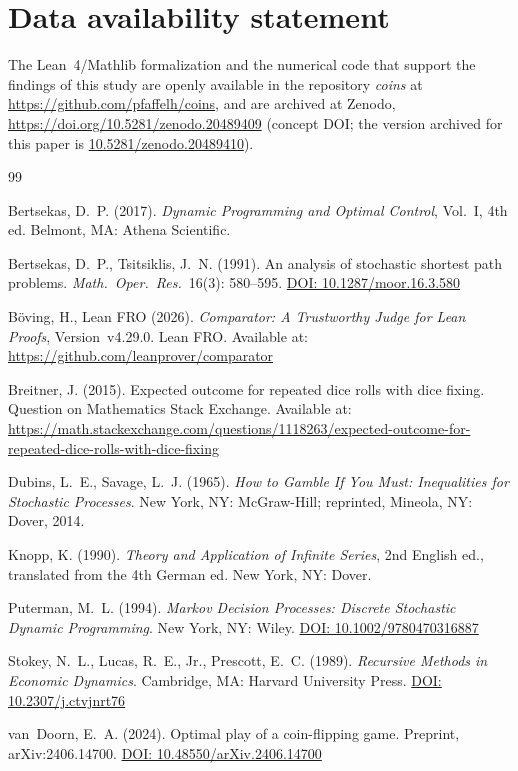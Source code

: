 \documentclass[12pt]{article}
\theoremstyle{definition}
\theoremstyle{remark}
\begin{document}
\section*{Data availability statement}

The Lean~4/Mathlib formalization and the numerical code that support
the findings of this study are openly available in the repository
\emph{coins} at \url{https://github.com/pfaffelh/coins}, and are
archived at Zenodo,
\url{https://doi.org/10.5281/zenodo.20489409} (concept DOI; the
version archived for this paper is
\href{https://doi.org/10.5281/zenodo.20489410}{10.5281/zenodo.20489410}).


\begin{thebibliography}{99}

  Bertsekas, D.~P. (2017).
  \emph{Dynamic Programming and Optimal Control},
  Vol.~I, 4th ed.
  Belmont, MA: Athena Scientific.

  Bertsekas, D.~P., Tsitsiklis, J.~N. (1991).
  An analysis of stochastic shortest path problems.
  \emph{Math.\ Oper.\ Res.}\ 16(3): 580--595.
  \href{https://doi.org/10.1287/moor.16.3.580}{DOI: 10.1287/moor.16.3.580}

  B\"oving, H., Lean FRO (2026).
  \emph{Comparator: A Trustworthy Judge for Lean Proofs},
  Version~v4.29.0. Lean FRO.
  Available at: \url{https://github.com/leanprover/comparator}

  Breitner, J. (2015).
  Expected outcome for repeated dice rolls with dice fixing.
  Question on Mathematics Stack Exchange.
  Available at:
  \url{https://math.stackexchange.com/questions/1118263/expected-outcome-for-repeated-dice-rolls-with-dice-fixing}

  Dubins, L.~E., Savage, L.~J. (1965).
  \emph{How to Gamble If You Must: Inequalities for Stochastic
    Processes}.
  New York, NY: McGraw-Hill; reprinted, Mineola, NY: Dover, 2014.

  Knopp, K. (1990).
  \emph{Theory and Application of Infinite Series},
  2nd English ed., translated from the 4th German ed.
  New York, NY: Dover.

  Puterman, M.~L. (1994).
  \emph{Markov Decision Processes: Discrete Stochastic Dynamic
    Programming}.
  New York, NY: Wiley.
  \href{https://doi.org/10.1002/9780470316887}{DOI: 10.1002/9780470316887}

  Stokey, N.~L., Lucas, R.~E., Jr., Prescott, E.~C. (1989).
  \emph{Recursive Methods in Economic Dynamics}.
  Cambridge, MA: Harvard University Press.
  \href{https://doi.org/10.2307/j.ctvjnrt76}{DOI: 10.2307/j.ctvjnrt76}

  van~Doorn, E.~A. (2024).
  Optimal play of a coin-flipping game.
  Preprint, arXiv:2406.14700.
  \href{https://doi.org/10.48550/arXiv.2406.14700}{DOI: 10.48550/arXiv.2406.14700}

\end{thebibliography}
\end{document}
